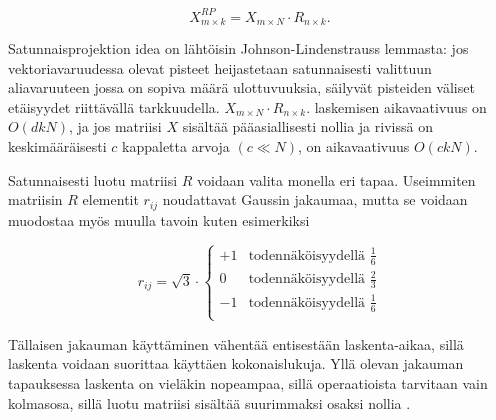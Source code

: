 \begin{equation}
X_{m \times k}^{RP} = X_{m \times N} \cdot R_{n \times k}.
\label{RP}
\end{equation}

Satunnaisprojektion idea on lähtöisin Johnson-Lindenstrauss lemmasta: jos vektoriavaruudessa olevat pisteet heijastetaan satunnaisesti valittuun aliavaruuteen jossa on sopiva määrä ulottuvuuksia, säilyvät pisteiden
väliset etäisyydet riittävällä tarkkuudella. $X_{m \times N} \cdot R_{n \times k}.$ laskemisen aikavaativuus on $O(dkN)$, ja jos matriisi $X$ sisältää pääasiallisesti nollia ja rivissä on keskimääräisesti $c$ kappaletta arvoja 
$(c \ll N)$, on aikavaativuus $O(ckN)$.

Satunnaisesti luotu matriisi $R$ voidaan valita monella eri tapaa. Useimmiten matriisin $R$ elementit $r_{ij}$ noudattavat Gaussin jakaumaa, mutta se voidaan muodostaa myös muulla tavoin kuten esimerkiksi

\begin{equation}
r_{ij} = \sqrt{3}\cdot 
\begin{cases}
 +1 &\text{todennäköisyydellä $\frac{1}{6}$} \\
 0 &\text{todennäköisyydellä $\frac{2}{3}$} \\
 -1 &\text{todennäköisyydellä $\frac{1}{6}$} \\
\end{cases}
\label{RPChoice}
\end{equation}

Tällaisen jakauman käyttäminen vähentää entisestään laskenta-aikaa, sillä laskenta voidaan suorittaa käyttäen kokonaislukuja. Yllä olevan jakauman tapauksessa laskenta on vieläkin nopeampaa, sillä operaatioista
tarvitaan vain kolmasosa, sillä luotu matriisi sisältää suurimmaksi osaksi nollia \cite{Random}.
